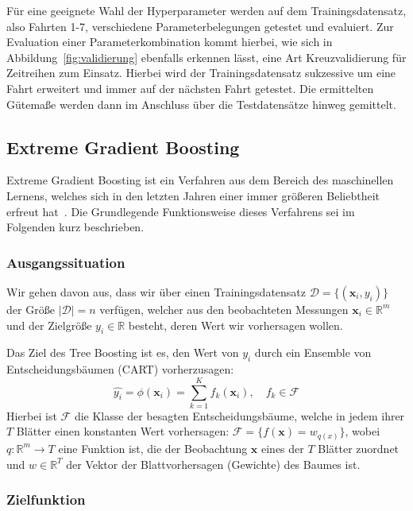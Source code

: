 F\"ur eine geeignete Wahl der Hyperparameter werden auf dem Trainingsdatensatz, also Fahrten 1-7, verschiedene Parameterbelegungen
getestet und evaluiert. Zur Evaluation einer Parameterkombination kommt hierbei, wie sich in Abbildung~\ref{fig:validierung} ebenfalls
erkennen l\"asst, eine Art Kreuzvalidierung f\"ur Zeitreihen zum Einsatz. Hierbei wird der Trainingsdatensatz sukzessive um eine Fahrt
erweitert und immer auf der n\"achsten Fahrt getestet. Die ermittelten G\"utema{\ss}e werden dann im Anschluss \"uber die
Testdatens\"atze hinweg gemittelt.

\subsection{Extreme Gradient Boosting}
\label{sec:xgboost}

Extreme Gradient Boosting ist ein Verfahren aus dem Bereich des maschinellen Lernens, welches sich
in den letzten Jahren einer immer gr\"o{\ss}eren Beliebtheit erfreut hat~\cite{XGBoost}.
Die Grundlegende Funktionsweise dieses Verfahrens sei im Folgenden kurz beschrieben.

\subsubsection{Ausgangssituation}

Wir gehen davon aus, dass wir \"uber einen Trainingsdatensatz $\mathcal{D} = \{(\mathbf{x}_i, y_i)\}$
der Gr\"o{\ss}e $\left| \mathcal{D} \right| = n$ verf\"ugen, welcher aus den beobachteten Messungen $\mathbf{x}_i \in \mathbb{R}^m$
und der Zielgr\"o{\ss}e $y_i \in \mathbb{R}$ besteht, deren Wert wir vorhersagen wollen.

Das Ziel des Tree Boosting ist es, den Wert von $y_i$ durch ein Ensemble von Entscheidungsb\"aumen (CART)
vorherzusagen:
\begin{equation}
    \hat{y_i} = \phi(\mathbf{x}_i) =  \sum_{k=1}^K f_k(\mathbf{x}_i), \quad f_k \in \mathcal{F}
\end{equation}
Hierbei ist $\mathcal{F}$ die Klasse der besagten Entscheidungsb\"aume, welche in jedem ihrer $T$ Bl\"atter
einen konstanten Wert vorhersagen: $\mathcal{F} = \{f(\mathbf{x}) = w_{q(x)}\}$, wobei $q: \mathbb{R}^m \rightarrow T$
eine Funktion ist, die der Beobachtung $\mathbf{x}$ eines der $T$ Bl\"atter zuordnet und $w \in \mathbb{R}^T$ der Vektor
der Blattvorhersagen (Gewichte) des Baumes ist.

\subsubsection{Zielfunktion}

